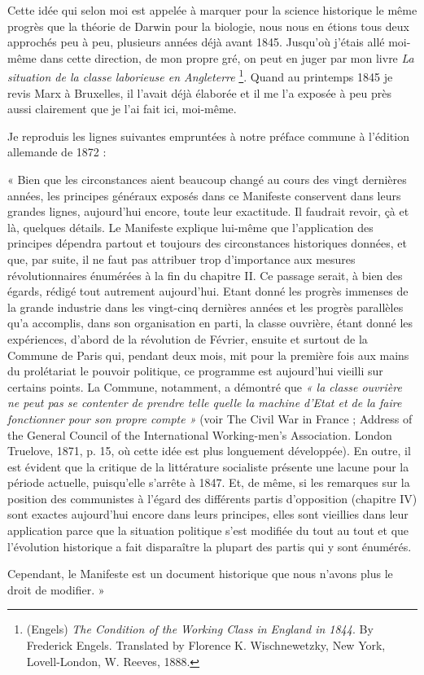 \documentclass[french,twoside]{book} %
\newenvironment{quoteblock}%
  {\begin{quoting}}
  {\end{quoting}}
\newenvironment{quotebar}{%
    \def\FrameCommand{{\color{rubric!10!}\vrule width 0.5em} \hspace{0.9em}}%
    \def\OuterFrameSep{\itemsep} %
    \MakeFramed {\advance\hsize-\width \FrameRestore}
  }%
  {%
    \endMakeFramed
  }
\renewenvironment{quoteblock}%
  {%
    \savenotes
    \setstretch{0.9}
    \begin{quotebar}
  }
  {%
    \end{quotebar}
    \spewnotes
  }
\begin{document}
Cette idée qui selon moi est appelée à marquer pour la science historique le même progrès que la théorie de Darwin pour la biologie, nous nous en étions tous deux approchés peu à peu, plusieurs années déjà avant 1845. Jusqu’où j’étais allé moi-même dans cette direction, de mon propre gré, on peut en juger par mon livre \emph{La situation de la classe laborieuse en Angleterre} \footnote{(Engels) \emph{The Condition of the Working Class in England in 1844}. By Frederick Engels. Translated by Florence K. Wischnewetzky, New York, Lovell-London, W. Reeves, 1888.}. Quand au printemps 1845 je revis Marx à Bruxelles, il l’avait déjà élaborée et il me l’a exposée à peu près aussi clairement que je l’ai fait ici, moi-même.\par
Je reproduis les lignes suivantes empruntées à notre préface commune à l’édition allemande de 1872 :\par

\begin{quoteblock}
 \noindent « Bien que les circonstances aient beaucoup changé au cours des vingt dernières années, les principes généraux exposés dans ce Manifeste conservent dans leurs grandes lignes, aujourd’hui encore, toute leur exactitude. Il faudrait revoir, çà et là, quelques détails. Le Manifeste explique lui-même que l’application des principes dépendra partout et toujours des circonstances historiques données, et que, par suite, il ne faut pas attribuer trop d’importance aux mesures révolutionnaires énumérées à la fin du chapitre II. Ce passage serait, à bien des égards, rédigé tout autrement aujourd’hui. Etant donné les progrès immenses de la grande industrie dans les vingt-cinq dernières années et les progrès parallèles qu’a accomplis, dans son organisation en parti, la classe ouvrière, étant donné les expériences, d’abord de la révolution de Février, ensuite et surtout de la Commune de Paris qui, pendant deux mois, mit pour la première fois aux mains du prolétariat le pouvoir politique, ce programme est aujourd’hui vieilli sur certains points. La Commune, notamment, a démontré que \emph{« la classe ouvrière ne peut pas se contenter de prendre telle quelle la machine d’Etat et de la faire fonctionner pour son propre compte »} (voir The Civil War in France ; Address of the General Council of the International Working-men’s Association. London Truelove, 1871, p. 15, où cette idée est plus longuement développée). En outre, il est évident que la critique de la littérature socialiste présente une lacune pour la période actuelle, puisqu’elle s’arrête à 1847. Et, de même, si les remarques sur la position des communistes à l’égard des différents partis d’opposition (chapitre IV) sont exactes aujourd’hui encore dans leurs principes, elles sont vieillies dans leur application parce que la situation politique s’est modifiée du tout au tout et que l’évolution historique a fait disparaître la plupart des partis qui y sont énumérés.\par
 Cependant, le Manifeste est un document historique que nous n’avons plus le droit de modifier. »
 \end{quoteblock}
\end{document}
